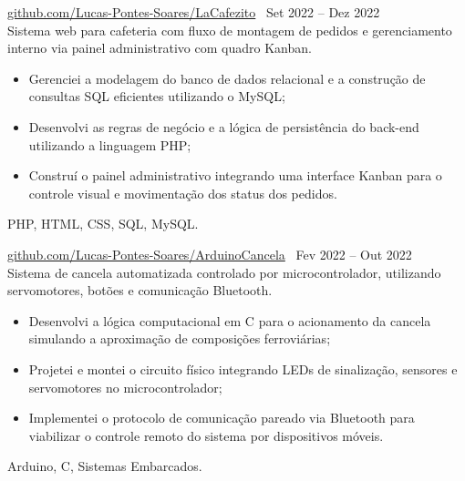         
 \textbar{}  \href{https://github.com/Lucas-Pontes-Soares/LaCafezito}{github.com/Lucas-Pontes-Soares/LaCafezito} \hfill\ Set 2022 -- Dez 2022 \\
Sistema web para cafeteria com fluxo de montagem de pedidos e gerenciamento interno via painel administrativo com quadro Kanban.
\begin{itemize}
    \item Gerenciei a modelagem do banco de dados relacional e a construção de consultas SQL eficientes utilizando o MySQL;
    \item Desenvolvi as regras de negócio e a lógica de persistência do back-end utilizando a linguagem PHP;
    \item Construí o painel administrativo integrando uma interface Kanban para o controle visual e movimentação dos status dos pedidos.
\end{itemize}
 PHP, HTML, CSS, SQL, MySQL.

        
 \textbar{}  \href{https://github.com/Lucas-Pontes-Soares/ArduinoCancela}{github.com/Lucas-Pontes-Soares/ArduinoCancela} \hfill\ Fev 2022 -- Out 2022 \\
Sistema de cancela automatizada controlado por microcontrolador, utilizando servomotores, botões e comunicação Bluetooth.
\begin{itemize}
    \item Desenvolvi a lógica computacional em C para o acionamento da cancela simulando a aproximação de composições ferroviárias;
    \item Projetei e montei o circuito físico integrando LEDs de sinalização, sensores e servomotores no microcontrolador;
    \item Implementei o protocolo de comunicação pareado via Bluetooth para viabilizar o controle remoto do sistema por dispositivos móveis.
\end{itemize}
 Arduino, C, Sistemas Embarcados.

        
